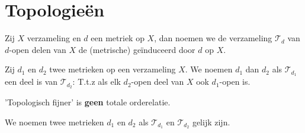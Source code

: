 \documentclass[main.tex]{subfiles}
\begin{document}
\section{Topologie\"en}
\label{sec:topologieen}

\begin{de}
  Zij $X$ verzameling en $d$ een metriek op $X$, dan noemen we de verzameling $\mathcal{T}_{d}$ van $d$-open delen van $X$ de (metrische)  ge\"induceerd door $d$ op $X$.
\end{de}

\begin{de}
  Zij $d_{1}$ en $d_{2}$ twee metrieken op een verzameling $X$.
  We noemen $d_{1}$  dan $d_{2}$ als $\mathcal{T}_{d_{1}}$ een deel is van $\mathcal{T}_{d_{2}}$:
  T.t.z als elk $d_{2}$-open deel van $X$ ook $d_{1}$-open is.
\end{de}

\begin{opm}
  'Topologisch fijner' is \textbf{geen} totale orderelatie.
\end{opm}

\begin{de}
  We noemen twee metrieken $d_{1}$ en $d_{2}$  als $\mathcal{T}_{d_{1}}$ en $\mathcal{T}_{d_{2}}$ gelijk zijn.
\end{de}
\end{document}
